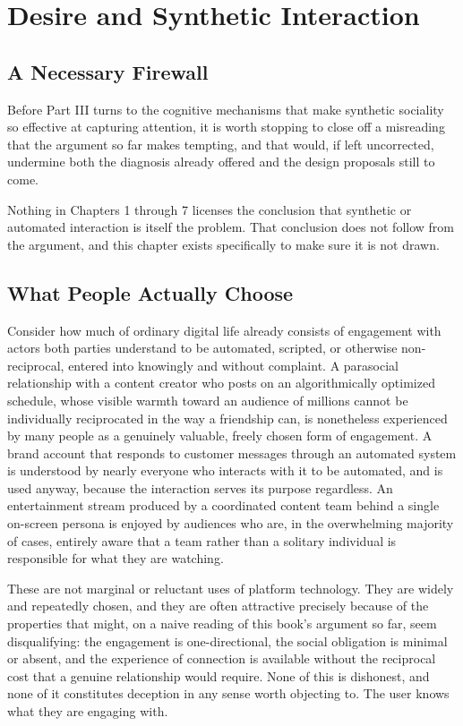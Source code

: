 \documentclass[12pt,a4paper]{book}
\begin{document}
\chapter{Desire and Synthetic Interaction}

\section{A Necessary Firewall}

Before Part III turns to the cognitive mechanisms that make synthetic sociality so effective at capturing attention, it is worth stopping to close off a misreading that the argument so far makes tempting, and that would, if left uncorrected, undermine both the diagnosis already offered and the design proposals still to come.

Nothing in Chapters 1 through 7 licenses the conclusion that synthetic or automated interaction is itself the problem. That conclusion does not follow from the argument, and this chapter exists specifically to make sure it is not drawn.

\section{What People Actually Choose}

Consider how much of ordinary digital life already consists of engagement with actors both parties understand to be automated, scripted, or otherwise non-reciprocal, entered into knowingly and without complaint. A parasocial relationship with a content creator who posts on an algorithmically optimized schedule, whose visible warmth toward an audience of millions cannot be individually reciprocated in the way a friendship can, is nonetheless experienced by many people as a genuinely valuable, freely chosen form of engagement. A brand account that responds to customer messages through an automated system is understood by nearly everyone who interacts with it to be automated, and is used anyway, because the interaction serves its purpose regardless. An entertainment stream produced by a coordinated content team behind a single on-screen persona is enjoyed by audiences who are, in the overwhelming majority of cases, entirely aware that a team rather than a solitary individual is responsible for what they are watching.

These are not marginal or reluctant uses of platform technology. They are widely and repeatedly chosen, and they are often attractive precisely because of the properties that might, on a naive reading of this book's argument so far, seem disqualifying: the engagement is one-directional, the social obligation is minimal or absent, and the experience of connection is available without the reciprocal cost that a genuine relationship would require. None of this is dishonest, and none of it constitutes deception in any sense worth objecting to. The user knows what they are engaging with.
\end{document}
